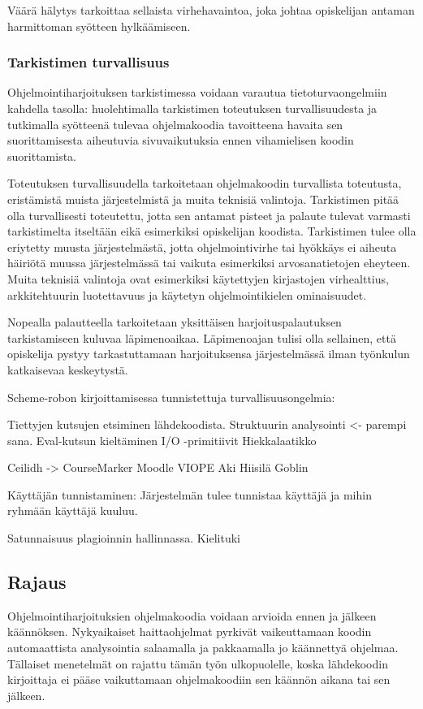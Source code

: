 Väärä hälytys tarkoittaa sellaista virhehavaintoa, joka johtaa opiskelijan
antaman harmittoman syötteen hylkäämiseen.

\subsubsection{Tarkistimen turvallisuus}

Ohjelmointiharjoituksen tarkistimessa voidaan varautua tietoturvaongelmiin
kahdella tasolla: huolehtimalla tarkistimen toteutuksen turvallisuudesta ja
tutkimalla syötteenä tulevaa ohjelmakoodia tavoitteena havaita sen
suorittamisesta aiheutuvia sivuvaikutuksia ennen vihamielisen koodin
suorittamista.

Toteutuksen turvallisuudella tarkoitetaan ohjelmakoodin turvallista
toteutusta, eristämistä muista järjestelmistä ja muita teknisiä valintoja.
Tarkistimen pitää olla turvallisesti toteutettu, jotta sen antamat pisteet ja
palaute tulevat varmasti tarkistimelta itseltään eikä esimerkiksi opiskelijan
koodista. Tarkistimen tulee olla eriytetty muusta järjestelmästä, jotta
ohjelmointivirhe tai hyökkäys ei aiheuta häiriötä muussa järjestelmässä tai
vaikuta esimerkiksi arvosanatietojen eheyteen. Muita teknisiä valintoja ovat
esimerkiksi käytettyjen kirjastojen virhealttius, arkkitehtuurin luotettavuus
ja käytetyn ohjelmointikielen ominaisuudet.

Nopealla palautteella tarkoitetaan yksittäisen harjoituspalautuksen
tarkistamiseen kuluvaa läpimenoaikaa. Läpimenoajan tulisi olla sellainen, että
opiskelija pystyy tarkastuttamaan harjoituksensa järjestelmässä ilman työnkulun
katkaisevaa keskeytystä.

Scheme-robon kirjoittamisessa tunnistettuja turvallisuusongelmia:

Tiettyjen kutsujen etsiminen lähdekoodista.
Struktuurin analysointi <- parempi sana.
Eval-kutsun kieltäminen
I/O -primitiivit
Hiekkalaatikko

Ceilidh -> CourseMarker
Moodle
VIOPE
Aki Hiisilä Goblin

Käyttäjän tunnistaminen: Järjestelmän tulee tunnistaa käyttäjä ja mihin ryhmään käyttäjä kuuluu.

Satunnaisuus plagioinnin hallinnassa. Kielituki

\subsection{Rajaus}

Ohjelmointiharjoituksien ohjelmakoodia voidaan arvioida ennen ja jälkeen
käännöksen. Nykyaikaiset haittaohjelmat pyrkivät vaikeuttamaan koodin
automaattista analysointia salaamalla ja pakkaamalla jo käännettyä ohjelmaa.
Tällaiset menetelmät on rajattu tämän työn ulkopuolelle, koska lähdekoodin
kirjoittaja ei pääse vaikuttamaan ohjelmakoodiin sen käännön aikana tai sen
jälkeen.


